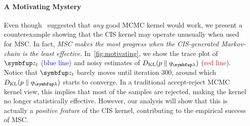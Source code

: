 
\vspace{-0.1in}
\paragraph{A Motivating Mystery}
Even though~\citeauthor{NEURIPS2020_b2070693} suggested that \textit{any} good MCMC kernel would work, we present a counterexample showing that the CIS kernel may operate unusually when used for MSC.
In fact, \textit{MSC makes the most progress when the CIS-generated Markov-chain is the least effective}.
In~\cref{fig:motivating}, we show the trace plot of \(\vz_t\) (\textcolor{blue}{blue line}) and noisy estimates of \(\DKL{p}{q_{\vlambda}}\) (\textcolor{red}{red line}).
Notice that \(\vz_t\) barely moves until iteration 300, around which \(\DKL{p}{q_{\vlambda}}\) starts to converge.
In a traditional accept-reject MCMC kernel view, this implies that most of the samples are rejected, making the kernel no longer statistically effective.
However, our analysis will show that this is actually a \textit{positive feature} of the CIS kernel, contributing to the empirical success of MSC.


%

